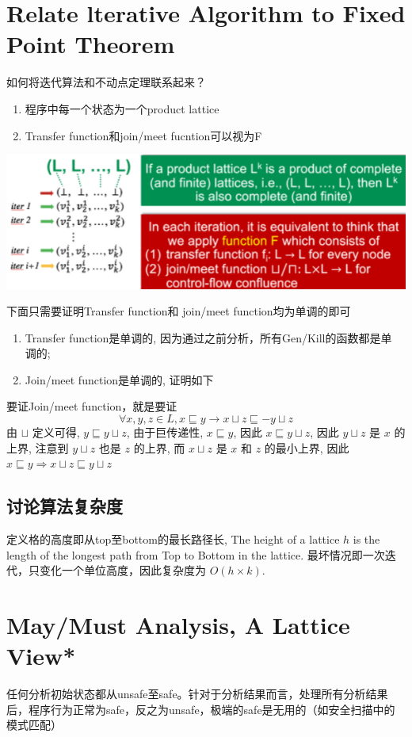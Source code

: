 \documentclass[a4paper]{article}
\theoremstyle{definition}
\begin{document}
\section{Relate lterative Algorithm to Fixed Point Theorem}
如何将迭代算法和不动点定理联系起来？
\begin{enumerate}
  \item 程序中每一个状态为一个product lattice
  \item Transfer function和join/meet fucntion可以视为F
\end{enumerate}

\includegraphics{img/lattice.png}

下面只需要证明Transfer function和 join/meet function均为单调的即可

\begin{enumerate}
\item Transfer function是单调的, 因为通过之前分析，所有Gen/Kill的函数都是单
调的;
\item Join/meet function是单调的, 证明如下
\end{enumerate}
要证Join/meet function，就是要证
$$\forall x, y, z \in L, x \sqsubseteq y \rightarrow x \sqcup z \sqsubseteq - y \sqcup z$$
由 $\sqcup$ 定义可得, $y \sqsubseteq y \sqcup z$,
由于巨传递性, $x \sqsubseteq y$, 因此 $x \sqsubseteq y \sqcup z$, 因此 $y \sqcup z$ 是 $x$ 的上界,
注意到 $y \sqcup z$ 也是 $z$ 的上界, 而 $x \sqcup z$ 是 $x$ 和 $z$ 的最小上界,
因此 $x \sqsubseteq y \Rightarrow x \sqcup z \sqsubseteq y \sqcup z$

\subsection{讨论算法复杂度}
定义格的高度即从top至bottom的最长路径长,
The height of a lattice $h$ is the length of the longest path from Top to
Bottom in the lattice.
最坏情况即一次迭代，只变化一个单位高度，因此复杂度为 $O(h \times k) .$

\section{May/Must Analysis, A Lattice View*}
任何分析初始状态都从unsafe至safe。针对于分析结果而言，处理所有分析结果后，程序行为正常为safe，反之为unsafe，极端的safe是无用的（如安全扫描中的模式匹配）
\end{document}
